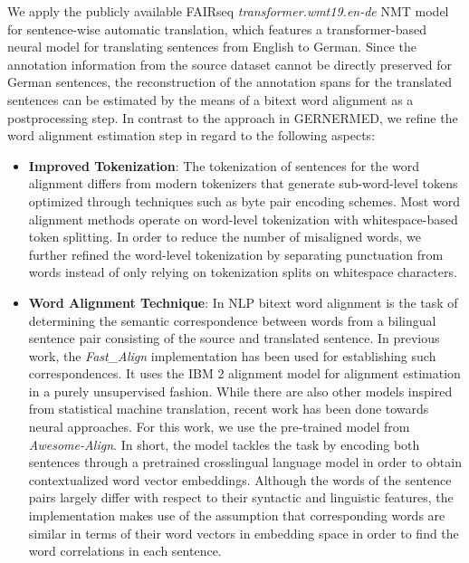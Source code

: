 \documentclass[runningheads]{llncs}
\begin{document}
We apply the publicly available FAIRseq \textit{transformer.wmt19.en-de}\cite{ott_fairseq_2019} NMT model for sentence-wise automatic translation, which features a transformer-based neural model for translating sentences from English to German. Since the annotation information from the source dataset cannot be directly preserved for German sentences, the reconstruction of the annotation spans for the translated sentences can be estimated by the means of a bitext word alignment as a postprocessing step. In contrast to the approach in GERNERMED, we refine the word alignment estimation step in regard to the following aspects:
\begin{itemize}
    \item \textbf{Improved Tokenization}: The tokenization of sentences for the word alignment differs from modern tokenizers that generate sub-word-level tokens optimized through techniques such as byte pair encoding schemes. Most word alignment methods operate on word-level tokenization with whitespace-based token splitting. In order to reduce the number of misaligned words, we further refined the word-level tokenization by separating punctuation from words instead of only relying on tokenization splits on whitespace characters.
    \item \textbf{Word Alignment Technique}: In NLP bitext word alignment is the task of determining the semantic correspondence between words from a bilingual sentence pair consisting of the source and translated sentence. In previous work, the \textit{Fast\_Align}\cite{dyer_simple_2013} implementation has been used for establishing such correspondences. It uses the IBM 2 alignment model for alignment estimation in a purely unsupervised fashion. While there are also other models inspired from statistical machine translation\cite{och_systematic_2003,ostling_efficient_2016}, recent work has been done towards neural approaches\cite{jalili_sabet_simalign_2020,dou_word_2021}. For this work, we use the pre-trained model from \textit{Awesome-Align}\cite{dou_word_2021}. In short, the model tackles the task by encoding both sentences through a pretrained crosslingual language model in order to obtain contextualized word vector embeddings. Although the words of the sentence pairs largely differ with respect to their syntactic and linguistic features, the implementation makes use of the assumption that corresponding words are similar in terms of their word vectors in embedding space in order to find the word correlations in each sentence.
\end{itemize}
\end{document}
